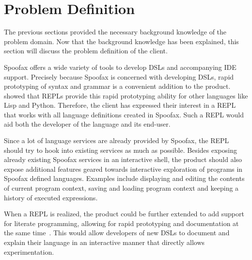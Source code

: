 \section{Problem Definition}
\label{sec:problem-definition}

The previous sections provided the necessary background knowledge of
the problem domain. Now that the background knowledge has been
explained, this section will discuss the problem definition of the
client.

Spoofax offers a wide variety of tools to develop DSLs and
accompanying IDE support. Precisely because Spoofax is concerned with
developing DSLs, rapid prototyping of syntax and grammar is a
convenient addition to the product.  showed that REPLs
provide this rapid prototyping ability for other languages like Lisp
and Python. Therefore, the client has expressed their interest in
a REPL that works with all language definitions created in
Spoofax. Such a REPL would aid both the developer of the language and
its end-user.

Since a lot of language services are already provided by Spoofax, the
REPL should try to hook into existing services as much as possible.
Besides exposing already existing Spoofax services in an interactive
shell, the product should also expose additional features geared
towards interactive exploration of programs in Spoofax defined
languages.  Examples include displaying and editing the contents of
current program context, saving and loading program context and
keeping a history of executed expressions.

When a REPL is realized, the product could be further extended to add
support for literate programming, allowing for rapid prototyping and
documentation at the same time~\cite{schulte2012}. This would allow
developers of new DSLs to document and explain their language in an
interactive manner that directly allows experimentation.

